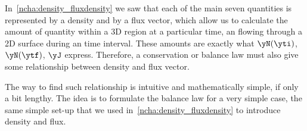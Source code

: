 \label{nsec:balance_derivative}

In \chap\,\ref{ncha:density_fluxdensity} we saw that each of the main seven quantities is represented by a density and by a flux vector, which allow us to calculate the amount of quantity within a 3D region at a particular time, an flowing through a 2D surface during an time interval. These amounts are exactly what $\yN(\yti)$, $\yN(\ytf)$, $\yJ$ express. Therefore, a conservation or balance law must also give some relationship between density and flux vector.

The way to find such relationship is intuitive and mathematically simple, if only a bit lengthy. The idea is to formulate the balance law for a very simple case, the same simple set-up that we used in \chap\,\ref{ncha:density_fluxdensity} to introduce density and flux.


